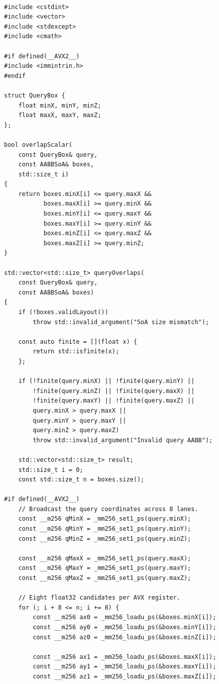 \begin{verbatim}

#include <cstdint>
#include <vector>
#include <stdexcept>
#include <cmath>

#if defined(__AVX2__)
#include <immintrin.h>
#endif

struct QueryBox {
    float minX, minY, minZ;
    float maxX, maxY, maxZ;
};

bool overlapScalar(
    const QueryBox& query,
    const AABBSoA& boxes,
    std::size_t i)
{
    return boxes.minX[i] <= query.maxX &&
           boxes.maxX[i] >= query.minX &&
           boxes.minY[i] <= query.maxY &&
           boxes.maxY[i] >= query.minY &&
           boxes.minZ[i] <= query.maxZ &&
           boxes.maxZ[i] >= query.minZ;
}

std::vector<std::size_t> queryOverlaps(
    const QueryBox& query,
    const AABBSoA& boxes)
{
    if (!boxes.validLayout())
        throw std::invalid_argument("SoA size mismatch");

    const auto finite = [](float x) {
        return std::isfinite(x);
    };

    if (!finite(query.minX) || !finite(query.minY) ||
        !finite(query.minZ) || !finite(query.maxX) ||
        !finite(query.maxY) || !finite(query.maxZ) ||
        query.minX > query.maxX ||
        query.minY > query.maxY ||
        query.minZ > query.maxZ)
        throw std::invalid_argument("Invalid query AABB");

    std::vector<std::size_t> result;
    std::size_t i = 0;
    const std::size_t n = boxes.size();

#if defined(__AVX2__)
    // Broadcast the query coordinates across 8 lanes.
    const __m256 qMinX = _mm256_set1_ps(query.minX);
    const __m256 qMinY = _mm256_set1_ps(query.minY);
    const __m256 qMinZ = _mm256_set1_ps(query.minZ);

    const __m256 qMaxX = _mm256_set1_ps(query.maxX);
    const __m256 qMaxY = _mm256_set1_ps(query.maxY);
    const __m256 qMaxZ = _mm256_set1_ps(query.maxZ);

    // Eight float32 candidates per AVX register.
    for (; i + 8 <= n; i += 8) {
        const __m256 ax0 = _mm256_loadu_ps(&boxes.minX[i]);
        const __m256 ay0 = _mm256_loadu_ps(&boxes.minY[i]);
        const __m256 az0 = _mm256_loadu_ps(&boxes.minZ[i]);

        const __m256 ax1 = _mm256_loadu_ps(&boxes.maxX[i]);
        const __m256 ay1 = _mm256_loadu_ps(&boxes.maxY[i]);
        const __m256 az1 = _mm256_loadu_ps(&boxes.maxZ[i]);


\end{verbatim}
